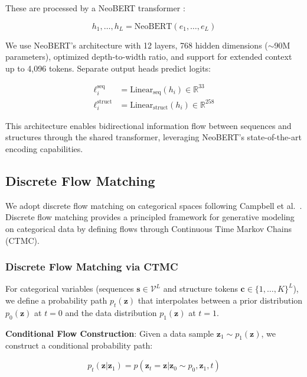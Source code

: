 \documentclass[11pt,a4paper]{article}
\newcommand{\real}{\mathbb{R}}
\newcommand{\vocab}{\mathcal{V}}
\begin{document}
These are processed by a NeoBERT transformer \cite{lebreton2025}:

\begin{equation}
h_1, \ldots, h_L = \text{NeoBERT}(e_1, \ldots, e_L)
\end{equation}

We use NeoBERT's architecture with 12 layers, 768 hidden dimensions ($\sim$90M parameters), optimized depth-to-width ratio, and support for extended context up to 4,096 tokens. Separate output heads predict logits:

\begin{align}
\ell_i^{\text{seq}} &= \text{Linear}_{\text{seq}}(h_i) \in \real^{33} \\
\ell_i^{\text{struct}} &= \text{Linear}_{\text{struct}}(h_i) \in \real^{258}
\end{align}

This architecture enables bidirectional information flow between sequences and structures through the shared transformer, leveraging NeoBERT's state-of-the-art encoding capabilities.

\subsection{Discrete Flow Matching}

We adopt discrete flow matching on categorical spaces following Campbell et al.~\cite{campbell2024}. Discrete flow matching provides a principled framework for generative modeling on categorical data by defining flows through Continuous Time Markov Chains (CTMC).

\subsubsection{Discrete Flow Matching via CTMC}

For categorical variables (sequences $\mathbf{s} \in \vocab^L$ and structure tokens $\mathbf{c} \in \{1,\ldots,K\}^L$), we define a probability path $p_t(\mathbf{z})$ that interpolates between a prior distribution $p_0(\mathbf{z})$ at $t=0$ and the data distribution $p_1(\mathbf{z})$ at $t=1$.

\textbf{Conditional Flow Construction}: Given a data sample $\mathbf{z}_1 \sim p_1(\mathbf{z})$, we construct a conditional probability path:

\begin{equation}
p_t(\mathbf{z} | \mathbf{z}_1) = p(\mathbf{z}_t = \mathbf{z} | \mathbf{z}_0 \sim p_0, \mathbf{z}_1, t)
\end{equation}
\end{document}
